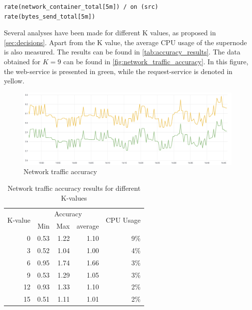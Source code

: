 \begin{verbatim}
rate(network_container_total[5m]) / on (src) 
rate(bytes_send_total[5m])
\end{verbatim}

\noindent
Several analyses have been made for different K values, as proposed in \autoref{sec:decisions}. Apart from the K value, the average CPU usage of the supernode is also measured. The results can be found in \autoref{tab:accuracy_results}. The data obtained for $K = 9$ can be found in \autoref{fig:network_traffic_accuracy}. In this figure, the web-service is presented in green, while the request-service is denoted in yellow.

\begin{figure}
    \centering
    \includegraphics[width=\textwidth]{gfx/traffic_network_accuracy}
    \caption{Network traffic accuracy}
    \label{fig:network_traffic_accuracy}
\end{figure}

\begin{table}[ht]
    \centering
    \begin{tabular}{r|rrr|r}
        \multirow{2}{*}{K-value} & \multicolumn{3}{|c|}{Accuracy} & \multirow{2}{*}{CPU Usage} \\
        & Min & Max & average & \\ \hline        
        0 & 0.53& 1.22& 1.10& 9\% \\
        3 & 0.52& 1.04& 1.00& 4\% \\
        6 & 0.95& 1.74& 1.66& 3\% \\
        9 & 0.53& 1.29& 1.05& 3\% \\
        12& 0.93& 1.33& 1.10& 2\% \\
        15& 0.51& 1.11& 1.01& 2\% \\        
    \end{tabular}
    \caption{Network traffic accuracy results for different K-values}
    \label{tab:accuracy_results}
\end{table}

